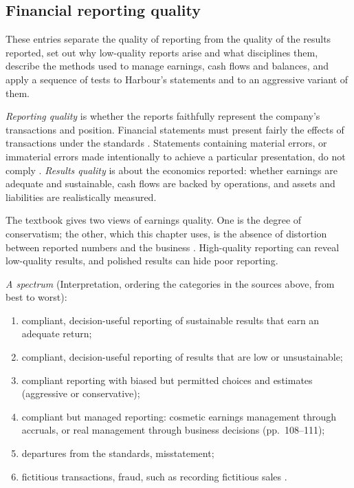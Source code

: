 \subsection{Financial reporting quality}

These entries separate the quality of reporting from the quality of the results reported, set out why low-quality reports arise and what disciplines them, describe the methods used to manage earnings, cash flows and balances, and apply a sequence of tests to Harbour's statements and to an aggressive variant of them.

\begin{qfdefinition}\label{def:reporting-results-quality}
 \emph{Reporting quality} is whether the reports faithfully represent the company's transactions and position. Financial statements must present fairly the effects of transactions under the standards \citep[IAS~1 para.~15]{eu-2023-1803-ias1}. Statements containing material errors, or immaterial errors made intentionally to achieve a particular presentation, do not comply \citep[IAS~8 para.~41]{eu-2023-1803-ias8}. \emph{Results quality} is about the economics reported: whether earnings are adequate and sustainable, cash flows are backed by operations, and assets and liabilities are realistically measured.

The textbook gives two views of earnings quality. One is the degree of conservatism; the other, which this chapter uses, is the absence of distortion between reported numbers and the business \citep[p.~112]{financial-statement-analysis-2009}. High-quality reporting can reveal low-quality results, and polished results can hide poor reporting.

\emph{A spectrum} (Interpretation, ordering the categories in the sources above, from best to worst):
\begin{enumerate}
\item compliant, decision-useful reporting of sustainable results that earn an adequate return;
\item compliant, decision-useful reporting of results that are low or unsustainable;
\item compliant reporting with biased but permitted choices and estimates (aggressive or conservative);
\item compliant but managed reporting: cosmetic earnings management through accruals, or real management through business decisions (pp.~108--111);
\item departures from the standards, misstatement;
\item fictitious transactions, fraud, such as recording fictitious sales \citep[p.~389]{financial-statement-analysis-2009}.
\end{enumerate}


\end{qfdefinition}
